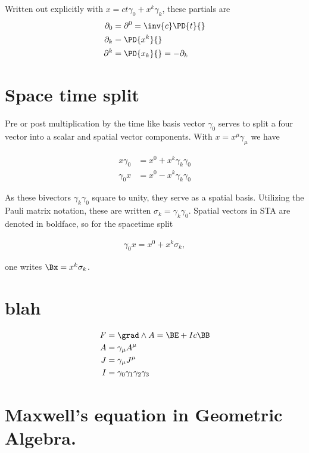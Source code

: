 Written out explicitly with $x = ct \gamma_0 + x^k \gamma_k$, these partials are
\begin{align*}
\partial_0 &= \partial^0 = \inv{c} \PD{t}{} \\
\partial_k &= \PD{x^k}{} \\
\partial^k &= \PD{x_k}{} = -\partial_k \\
\end{align*}

\section{Space time split}

Pre or post multiplication by the time like basis vector $\gamma_0$ serves to split a four vector into a scalar and spatial vector components.  With $x = x^\mu \gamma_\mu$ we have

\begin{align*}
x \gamma_0 &= x^0 + x^k \gamma_k \gamma_0 \\
\gamma_0 x &= x^0 - x^k \gamma_k \gamma_0 
\end{align*}

As these bivectors $\gamma_k \gamma_0$ square to unity, they serve as a spatial basis.  Utilizing the Pauli matrix notation, these are written $\sigma_k = \gamma_k \gamma_0$.  Spatial vectors in STA are denoted in boldface, so for the spacetime split

\begin{align*}
\gamma_0 x = x^0 + x^k \sigma_k,
\end{align*}

one writes $\Bx = x^k \sigma_k$.  

\section{blah}
\begin{align*}
F &= \grad \wedge A = \BE + I c \BB \\
A &= \gamma_\mu A^\mu \\
J &= \gamma_\mu J^\mu \\
I &= \gamma_0 \gamma_1 \gamma_2 \gamma_3 \\
\end{align*}

\section{Maxwell's equation in Geometric Algebra.}

